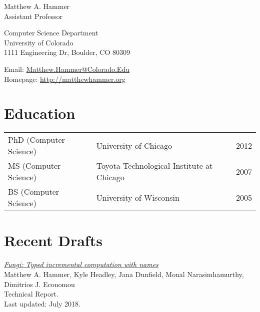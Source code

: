 \documentclass[10pt,letterpaper]{article}
\def\name{Matthew A. Hammer}
\renewenvironment{itemize}{
  \begin{list}{}{
    \setlength{\leftmargin}{1.5em}
    \setlength{\itemsep}{0.25em}
    \setlength{\parskip}{0pt}
    \setlength{\parsep}{0.25em}
  }
}{
  \end{list}
}
\begin{document}
{{\huge \name}
\\
Assistant Professor
}


\bigskip

\begin{minipage}[t]{0.495\textwidth}
Computer Science Department\\
University of Colorado\\
1111 Engineering Dr, Boulder, CO 80309
\end{minipage}
\begin{minipage}[t]{0.495\textwidth}
  Email: \href{mailto:matthew.hammer@colorado.edu}{Matthew.Hammer@Colorado.Edu} \\
  Homepage: \href{http://matthewhammer.org}{http://matthewhammer.org}
\end{minipage}

\section*{Education}

\begin{tabular}[t]{@{}l l l@{}}
PhD (Computer Science) & University of Chicago & 2012 \\
MS  (Computer Science) & Toyota Technological Institute at Chicago & 2007 \\
BS  (Computer Science) & University of Wisconsin & 2005 \\
\end{tabular}




\section*{Recent Drafts}

\begin{itemize}

\item
\href{https://arxiv.org/abs/1808.07826}
{\textit{Fungi: Typed incremental computation with names}}
\\
Matthew A. Hammer, Kyle Headley, Jana Dunfield, Monal Narasimhamurthy, Dimitrios J. Economou
\\
Technical Report.
\\
Last updated: July 2018.

\end{itemize}
\end{document}
